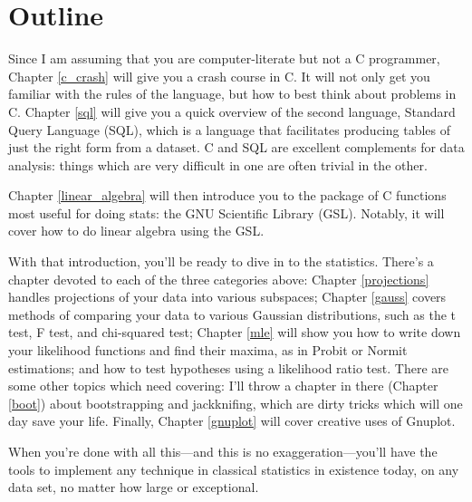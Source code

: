 \documentclass[12pt,notitlepage, openany]{book}
\begin{document}



\section{Outline} Since I am assuming that you are computer-literate but
not a C programmer, Chapter \ref{c_crash} will give you a crash course
in C. It will not only get you familiar with the rules of the language,
but how to best think about problems in C. 
Chapter \ref{sql} will give you a quick overview of the second language,
Standard Query Language (SQL), which is a language that facilitates
producing tables of just the right form from a dataset. C and SQL are
excellent complements for data analysis: things which are very difficult
in one are often trivial in the other.

Chapter \ref{linear_algebra}
will then introduce you to the package of C functions most useful for
doing stats: the GNU Scientific Library (GSL). Notably, it will cover
how to do linear algebra using the GSL.

With that introduction, you'll be ready to dive in to the
statistics. There's a chapter devoted to each of the three categories
above: Chapter \ref{projections} handles projections of your data into
various subspaces; Chapter \ref{gauss} covers methods of comparing your
data to various Gaussian distributions, such as the t test, F test,
and chi-squared test; Chapter \ref{mle} will show you how to write
down your likelihood functions and find their maxima, as in Probit
or Normit estimations; and how to test hypotheses using a likelihood
ratio test. There are some other topics which need covering: I'll
throw a chapter in there (Chapter \ref{boot}) about bootstrapping and
jackknifing, which are dirty tricks which will one day save your life.
Finally, Chapter \ref{gnuplot} will cover creative uses of Gnuplot.

When you're done with all this---and this is no exaggeration---you'll
have the tools to implement any technique in classical statistics in
existence today, on any data set, no matter how large or exceptional.










\printindex
\end{document}
